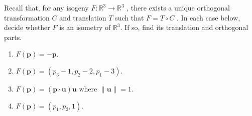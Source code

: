 \documentclass[12 pt, letterpaper]{hmcpset}
\begin{document}
\begin{problem}[Problem 3.]
	Recall that, for any isogeny $F : \mathbb{R}^{3} \to \mathbb{R}^{3}$ , there exists a unique orthogonal transformation $C$ and translation $T$  such that $F = T \circ C$ . In each case below, decide whether $F$  is an isometry of $\mathbb{R}^{3}$. If so, find its translation and orthogonal parts.
	\begin{enumerate}
		\item $F(\mathbf{p}) = - \mathbf{p}$.
		\item $F(\mathbf{p}) = (p_{3} - 1, p_{2} - 2, p_{1} - 3)$.
		\item $F(\mathbf{p}) = (\mathbf{p} \cdot \mathbf{u}) \mathbf{u}$ where $\lVert \mathbf{u} \rVert = 1$.
		\item $F(\mathbf{p}) = (p_{1}, p_{2}, 1)$.
	\end{enumerate}
\end{problem}
\end{document}
